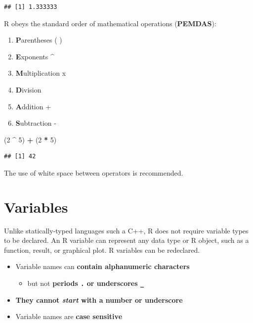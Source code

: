 \documentclass[]{book}
\newenvironment{Shaded}{\begin{snugshade}}{\end{snugshade}}
\newcommand{\DecValTok}[1]{\textcolor[rgb]{0.00,0.00,0.81}{#1}}
\newcommand{\NormalTok}[1]{#1}
\newcommand{\OperatorTok}[1]{\textcolor[rgb]{0.81,0.36,0.00}{\textbf{#1}}}
\newcommand{\StringTok}[1]{\textcolor[rgb]{0.31,0.60,0.02}{#1}}
\providecommand{\tightlist}{%
  \setlength{\itemsep}{0pt}\setlength{\parskip}{0pt}}
\theoremstyle{definition}
\theoremstyle{definition}
\theoremstyle{definition}
\theoremstyle{remark}
\begin{document}
\begin{verbatim}
## [1] 1.333333
\end{verbatim}

R obeys the standard order of mathematical operations (\textbf{PEMDAS}):

\begin{enumerate}
\def\labelenumi{\arabic{enumi}.}
\tightlist
\item
  \textbf{P}arentheses ( )
\item
  \textbf{E}xponents \^{}
\item
  \textbf{M}ultiplication x
\item
  \textbf{D}ivision\\
\item
  \textbf{A}ddition +
\item
  \textbf{S}ubtraction -
\end{enumerate}

\begin{Shaded}
\begin{Highlighting}[]
\NormalTok{(}\DecValTok{2} \OperatorTok{^}\StringTok{ }\DecValTok{5}\NormalTok{) }\OperatorTok{+}\StringTok{ }\NormalTok{(}\DecValTok{2} \OperatorTok{*}\StringTok{ }\DecValTok{5}\NormalTok{)}
\end{Highlighting}
\end{Shaded}

\begin{verbatim}
## [1] 42
\end{verbatim}

The use of white space between operators is recommended.

\hypertarget{variables}{%
\section{Variables}\label{variables}}

Unlike statically-typed languages such a C++, R does not require
variable types to be declared. An R variable can represent any data type
or R object, such as a function, result, or graphical plot. R variables
can be redeclared.

\begin{itemize}
\tightlist
\item
  Variable names can \textbf{contain alphanumeric characters}

  \begin{itemize}
  \tightlist
  \item
    but not \textbf{periods \texttt{.} or underscores \texttt{\_}}
  \end{itemize}
\item
  \textbf{They cannot \emph{start} with a number or underscore}
\item
  Variable names are \textbf{case sensitive}
\end{itemize}
\end{document}
